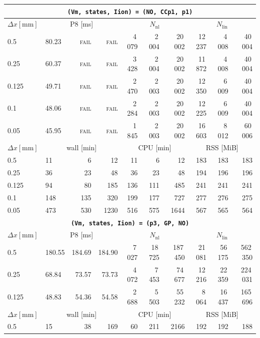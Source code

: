 \documentclass[11pt,a4paper]{article}
\newcommand{\code}[1]{\texttt{\small #1}}
\begin{document}
\begin{center}
\begin{longtable}{l|lrr|rrr|rrr}
\hline
\hline
\multicolumn{10}{c}{\textbf{\code{(Vm, states, Iion) = (NO, CCp1, p1)}}}\\\hline
$ \Delta x [\text{mm}] $ & \multicolumn{3}{c|}{P8 [ms]} & \multicolumn{3}{c|}{$N_{\mathrm{nl}}$} & \multicolumn{3}{c|}{$N_{\mathrm{lin}}$}\\
0.5 & 80.23 & \textsc{fail} & \textsc{fail} & 4\,079 & 2\,004 & 20\,002 & 12\,237 & 4\,008 & 40\,004\\
0.25 & 60.37 & \textsc{fail} & \textsc{fail} & 3\,428 & 2\,004 & 20\,002 & 11\,872 & 4\,008 & 40\,004\\
0.125 & 49.71 & \textsc{fail} & \textsc{fail} & 2\,470 & 2\,003 & 20\,002 & 12\,350 & 6\,009 & 40\,004\\
0.1 & 48.06 & \textsc{fail} & \textsc{fail} & 2\,284 & 2\,003 & 20\,002 & 12\,225 & 6\,009 & 40\,004\\
0.05 & 45.95 & \textsc{fail} & \textsc{fail} & 1\,845 & 2\,003 & 20\,002 & 16\,603 & 8\,012 & 60\,006\\
\hline
$ \Delta x [\text{mm}] $ & \multicolumn{3}{c|}{wall [min]} & \multicolumn{3}{c|}{CPU [min]} & \multicolumn{3}{c|}{RSS [MiB]}\\
0.5 & 11 & 6 & 12 & 11 & 6 & 12 & 183 & 183 & 183\\
0.25 & 36 & 23 & 48 & 36 & 23 & 48 & 194 & 196 & 196\\
0.125 & 94 & 80 & 185 & 136 & 111 & 485 & 241 & 241 & 241\\
0.1 & 148 & 135 & 320 & 199 & 177 & 727 & 277 & 276 & 275\\
0.05 & 473 & 530 & 1230 & 516 & 575 & 1644 & 567 & 565 & 564\\
\hline
\hline
\multicolumn{10}{c}{\textbf{\code{(Vm, states, Iion) = (p3, GP, NO)}}}\\\hline
$ \Delta x [\text{mm}] $ & \multicolumn{3}{c|}{P8 [ms]} & \multicolumn{3}{c|}{$N_{\mathrm{nl}}$} & \multicolumn{3}{c|}{$N_{\mathrm{lin}}$}\\
0.5 & 180.55 & 184.69 & 184.90 & 7\,027 & 18\,725 & 187\,450 & 21\,081 & 56\,175 & 562\,350\\
0.25 & 68.84 & 73.57 & 73.73 & 4\,072 & 7\,453 & 74\,677 & 12\,216 & 22\,359 & 224\,031\\
0.125 & 48.83 & 54.36 & 54.58 & 2\,688 & 5\,503 & 55\,232 & 8\,064 & 16\,437 & 165\,696\\
\hline
$ \Delta x [\text{mm}] $ & \multicolumn{3}{c|}{wall [min]} & \multicolumn{3}{c|}{CPU [min]} & \multicolumn{3}{c|}{RSS [MiB]}\\
0.5 & 15 & 38 & 169 & 60 & 211 & 2166 & 192 & 192 & 188\\

\end{longtable}
\end{center}
\end{document}

